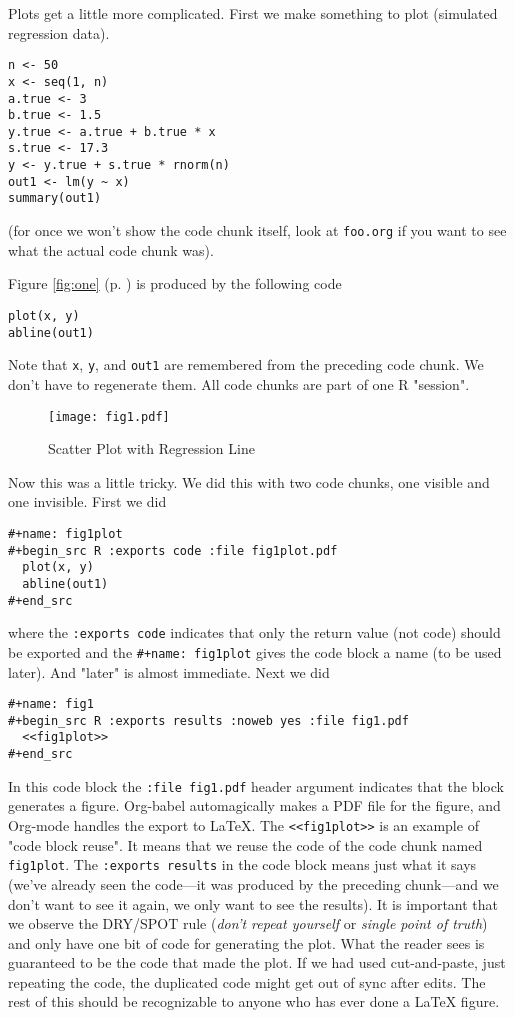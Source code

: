 \documentclass[11pt]{article}
\begin{document}
\pagebreak[3]

Plots get a little more complicated.  First we make something to plot
(simulated regression data).
\begin{verbatim}
n <- 50
x <- seq(1, n)
a.true <- 3
b.true <- 1.5
y.true <- a.true + b.true * x
s.true <- 17.3
y <- y.true + s.true * rnorm(n)
out1 <- lm(y ~ x)
summary(out1)
\end{verbatim}
(for once we won't show the code chunk itself, look at \texttt{foo.org} if
you want to see what the actual code chunk was).

Figure \ref{fig:one} (p. \pageref{fig:one}) is produced by the following code
\begin{verbatim}
plot(x, y)
abline(out1)
\end{verbatim}
Note that \texttt{x}, \texttt{y}, and \texttt{out1} are remembered from the preceding code
chunk.  We don't have to regenerate them.  All code chunks are part of
one R "session".
\begin{figure}[htbp]
\centering
\texttt{[image: fig1.pdf]}
\caption{\label{fig:orgf701293}
Scatter Plot with Regression Line}
\end{figure}

Now this was a little tricky.  We did this with two code chunks,
one visible and one invisible.  First we did
\begin{verbatim}
#+name: fig1plot
#+begin_src R :exports code :file fig1plot.pdf
  plot(x, y)
  abline(out1)
#+end_src
\end{verbatim}

where the \texttt{:exports code} indicates that only the return value (not
code) should be exported and the \texttt{\#+name: fig1plot} gives the code
block a name (to be used later).  And "later" is almost immediate.
Next we did
\begin{verbatim}
#+name: fig1
#+begin_src R :exports results :noweb yes :file fig1.pdf
  <<fig1plot>>
#+end_src
\end{verbatim}


In this code block the \texttt{:file fig1.pdf} header argument indicates that
the block generates a figure.  Org-babel automagically makes a PDF
file for the figure, and Org-mode handles the export to \LaTeX{}.  The
\texttt{<<fig1plot>>} is an example of "code block reuse".  It means that we
reuse the code of the code chunk named \texttt{fig1plot}.  The \texttt{:exports
results} in the code block means just what it says (we've already seen
the code---it was produced by the preceding chunk---and we don't want
to see it again, we only want to see the results).  It is important
that we observe the DRY/SPOT rule (\emph{don't repeat yourself} or \emph{single
point of truth}) and only have one bit of code for generating the
plot.  What the reader sees is guaranteed to be the code that made the
plot.  If we had used cut-and-paste, just repeating the code, the
duplicated code might get out of sync after edits.  The rest of this
should be recognizable to anyone who has ever done a \LaTeX{} figure.
\end{document}
